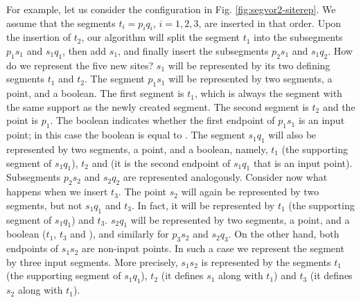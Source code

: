 For example, let us consider the configuration in
Fig. \ref{fig:segvor2-siterep}. We assume that the segments
$t_i=p_iq_i$, $i=1,2,3$, are inserted in that order. Upon the
insertion of $t_2$, our algorithm will split the segment $t_1$ into
the subsegments
$p_1s_1$ and $s_1q_1$, then add $s_1$, and finally insert the
subsegments $p_2s_1$ and $s_1q_2$. How do we represent the five new
sites? $s_1$ will be represented by its two defining segments $t_1$
and $t_2$. The segment $p_1s_1$ will be represented by two segments, a
point, and a boolean. The first segment is $t_1$, which is always the
segment with the same support as the newly created segment. The second
segment is $t_2$ and the point is $p_1$. The boolean indicates whether
the first endpoint of $p_1s_1$ is an input point; in this case the
boolean is equal to . The segment $s_1q_1$ will also be
represented by two segments, a point, and a boolean, namely, $t_1$
(the supporting segment of $s_1q_1$), $t_2$ and  (it is the
second endpoint of $s_1q_1$ that is an input point). Subsegments
$p_2s_2$ and $s_2q_2$ are represented analogously.
Consider now what happens when we insert $t_3$. The point 
$s_2$ will again be represented by two segments, but not $s_1q_1$ and
$t_3$. In fact, it will be represented by $t_1$ (the supporting
segment of $s_1q_1$) and $t_3$. $s_2q_1$ will be represented
by two segments, a point, and a boolean ($t_1$, $t_3$ and
), and similarly for $p_3s_2$ and $s_2q_3$. On the other
hand, both endpoints of $s_1s_2$ are non-input points. In such a
case we represent the segment by three input segments.
More precisely, $s_1s_2$ is represented by the segments $t_1$ (the
supporting segment of $s_1q_1$), $t_2$ (it defines $s_1$ along with
$t_1$) and $t_3$ (it defines $s_2$ along with $t_1$).

